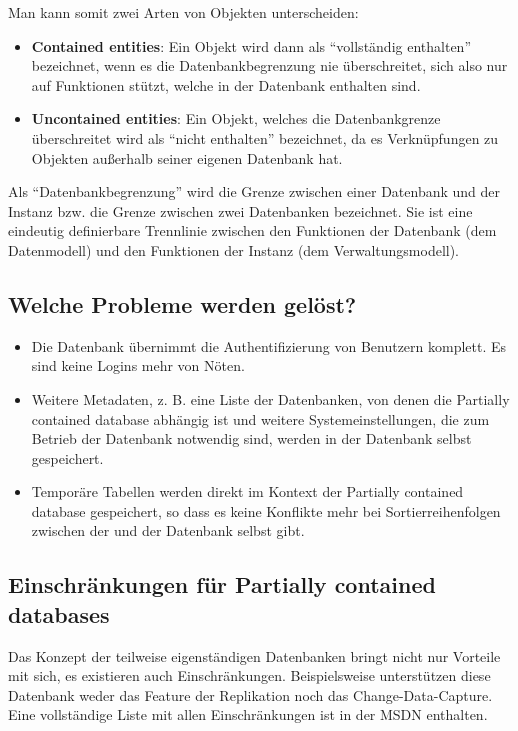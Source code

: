         Man kann somit zwei Arten von Objekten unterscheiden:
        \begin{itemize}
          \item \textbf{Contained entities}: Ein Objekt wird dann als
          \enquote{vollständig enthalten} bezeichnet, wenn es die
          Datenbankbegrenzung nie überschreitet, sich also nur auf Funktionen
          stützt, welche in der Datenbank enthalten sind.
          \item \textbf{Uncontained entities}: Ein Objekt, welches die
          Datenbankgrenze überschreitet wird als \enquote{nicht enthalten}
          bezeichnet, da es Verknüpfungen zu Objekten außerhalb seiner eigenen
          Datenbank hat.
        \end{itemize}
        \begin{merke}
          Als \enquote{Datenbankbegrenzung} wird die Grenze zwischen einer
          Datenbank und der Instanz bzw. die Grenze zwischen zwei Datenbanken
          bezeichnet. Sie ist eine eindeutig definierbare Trennlinie zwischen
          den Funktionen der Datenbank (dem Datenmodell) und den Funktionen
          der Instanz (dem Verwaltungsmodell).
        \end{merke}
        \subsection{Welche Probleme werden gelöst?}
          \begin{itemize}
            \item Die Datenbank übernimmt die Authentifizierung von Benutzern
            komplett. Es sind keine Logins mehr von Nöten.
            \item Weitere Metadaten, z. B. eine Liste der Datenbanken, von denen
            die Partially contained database abhängig ist und weitere
            Systemeinstellungen, die zum Betrieb der Datenbank notwendig
            sind, werden in der Datenbank selbst gespeichert.
            \item Temporäre Tabellen werden direkt im Kontext der Partially
            contained database gespeichert, so dass es keine Konflikte mehr bei
            Sortierreihenfolgen zwischen der  und der
            Datenbank selbst gibt.
          \end{itemize}
        \subsection{Einschränkungen für Partially contained databases}
          Das Konzept der teilweise eigenständigen Datenbanken bringt nicht nur
          Vorteile mit sich, es existieren auch Einschränkungen. Beispielsweise
          unterstützen diese Datenbank weder das Feature der Replikation noch
          das Change-Data-Capture. Eine vollständige Liste mit allen
          Einschränkungen ist in der MSDN enthalten.
          \begin{literaturinternet}
            \item \cite{ff929071}
          \end{literaturinternet}
